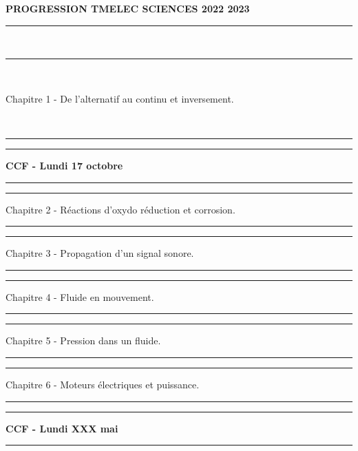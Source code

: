 \documentclass[11pt,a4paper]{article}
\begin{document}
\center \LARGE{ \textbf{PROGRESSION TMELEC SCIENCES 2022 2023}}
\\[0,5cm]

\normalsize

\hrule\
\\[0,5cm]


\hrule\
\\[0,5cm]
\begin{center} \large{{Chapitre 1 - De l'alternatif au continu et inversement.} }
~~ 

~~


\hrule

\vspace{1.5 cm}
\hrule
\vspace{0.5cm}
\large{\textbf{ CCF - Lundi 17 octobre }}
~~
\vspace{0.5cm}
\hrule
\vspace{1.5cm}

\hrule
\vspace{0.5cm}
\large{{ Chapitre 2 - Réactions d'oxydo réduction et corrosion.}}
\vspace{0.5cm}    

\hrule
\vspace{1.5 cm}
\hrule
\vspace{0.5cm}
\large{{ Chapitre 3 - Propagation d'un signal sonore.}}
\vspace{0.5cm}    

\hrule
\vspace{1.5 cm}
\hrule
\vspace{0.5cm}
\large{{ Chapitre 4 - Fluide en mouvement.}}
\vspace{0.5cm}   

\hrule
\vspace{1.5 cm}
\hrule
\vspace{0.5cm}
\large{{ Chapitre 5 - Pression dans un fluide.}}
\vspace{0.5cm}   

\hrule
\vspace{1.5 cm}
\hrule
\vspace{0.5cm}
\large{{ Chapitre 6 - Moteurs électriques et puissance.}}
\vspace{0.5cm} 


\hrule
\vspace{1.5 cm}
\hrule
\vspace{0.5cm}
\large{\textbf{ CCF -  Lundi XXX mai}}
\vspace{0.5cm} 
\hrule




\end{center}
\end{document}
